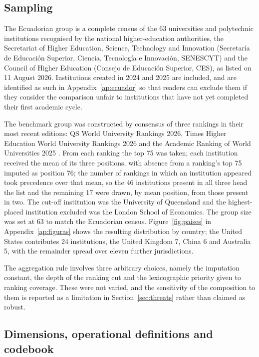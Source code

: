\documentclass[pdflatex,sn-basic,Numbered]{sn-jnl}
\theoremstyle{thmstyleone}
\theoremstyle{thmstyletwo}
\theoremstyle{thmstylethree}
\begin{document}
\subsection{Sampling}\label{sec:methods-sampling}

The Ecuadorian group is a complete census of the 63 universities and polytechnic institutions recognised by the national higher-education authorities, the Secretariat of Higher Education, Science, Technology and Innovation (Secretar\'ia de Educaci\'on Superior, Ciencia, Tecnolog\'ia e Innovaci\'on, SENESCYT) and the Council of Higher Education (Consejo de Educaci\'on Superior, CES), as listed on 11 August 2026. Institutions created in 2024 and 2025 are included, and are identified as such in Appendix~\ref{ap:ecuador} so that readers can exclude them if they consider the comparison unfair to institutions that have not yet completed their first academic cycle.

The benchmark group was constructed by consensus of three rankings in their most recent editions: QS World University Rankings 2026, Times Higher Education World University Rankings 2026 and the Academic Ranking of World Universities 2025 \citep{qs2026,the2026,arwu2025}. From each ranking the top 75 was taken; each institution received the mean of its three positions, with absence from a ranking's top 75 imputed as position 76; the number of rankings in which an institution appeared took precedence over that mean, so the 46 institutions present in all three head the list and the remaining 17 were drawn, by mean position, from those present in two. The cut-off institution was the University of Queensland and the highest-placed institution excluded was the London School of Economics. The group size was set at 63 to match the Ecuadorian census. Figure~\ref{fig:paises} in Appendix~\ref{ap:figuras} shows the resulting distribution by country; the United States contributes 24 institutions, the United Kingdom 7, China 6 and Australia 5, with the remainder spread over eleven further jurisdictions.

The aggregation rule involves three arbitrary choices, namely the imputation constant, the depth of the ranking cut and the lexicographic priority given to ranking coverage. These were not varied, and the sensitivity of the composition to them is reported as a limitation in Section~\ref{sec:threats} rather than claimed as robust.

\subsection{Dimensions, operational definitions and codebook}\label{sec:methods-codebook}
\end{document}
